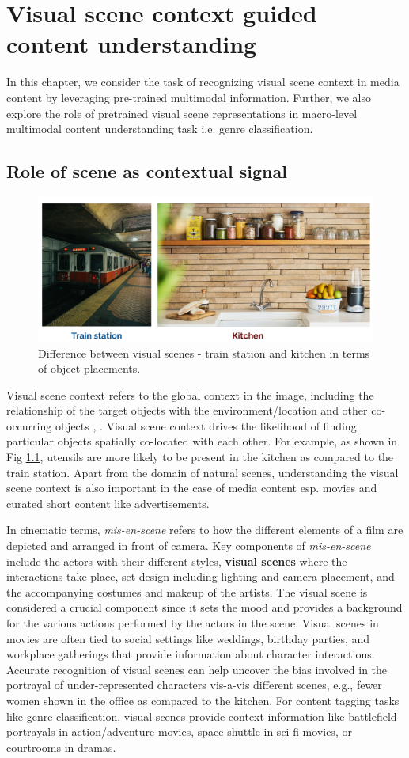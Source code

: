 \chapter{Visual scene context guided content understanding}

In this chapter, we consider the task of recognizing visual scene context in media content by leveraging pre-trained multimodal information.  Further, we also explore the role of pretrained visual scene representations in macro-level multimodal content understanding task i.e. genre classification.
\section{Role of scene as contextual signal}
\begin{figure}[h!]
    \centering 
     \includegraphics[width=0.6\linewidth]{figures/train_station_kitchen.png}
     \caption{Difference between visual scenes - train station and kitchen in terms of object placements.}
     \label{station_kitchen}
\end{figure}
Visual scene context refers to the global context in the image, including the relationship of the target objects with the environment/location and other co-occurring objects \cite{Bar2004VisualOI}, \cite{Qiao2021ObjectLevelSC}. Visual scene context drives the likelihood of finding particular objects spatially co-located with each other. For example, as shown in Fig \ref{station_kitchen}, utensils are more likely to be present in the kitchen as compared to the train station. 
Apart from the domain of natural scenes, understanding the visual scene context is also important in the case of media content \cite{CMI} esp. movies and curated short content like advertisements. 
\par
In cinematic terms, \textit{mis-en-scene} \cite{Bordwell1979FilmAA} refers to how the different elements of a film are depicted and arranged in front of camera. Key components of \textit{mis-en-scene} include the actors with their different styles, \textbf{visual scenes} where the interactions take place, set design including lighting and camera placement, and the accompanying costumes and makeup of the artists. The visual scene is considered a crucial component since it sets the mood and provides a background for the various actions performed by the actors in the scene. Visual scenes in movies are often tied to social settings like weddings, birthday parties, and workplace gatherings that provide information about character interactions. Accurate recognition of visual scenes can help uncover the bias involved in the portrayal of under-represented characters vis-a-vis different scenes, e.g., fewer women shown in the office as compared to the kitchen. For content tagging tasks like genre classification, visual scenes provide context information like battlefield portrayals in action/adventure movies, space-shuttle in sci-fi movies, or courtrooms in dramas.
